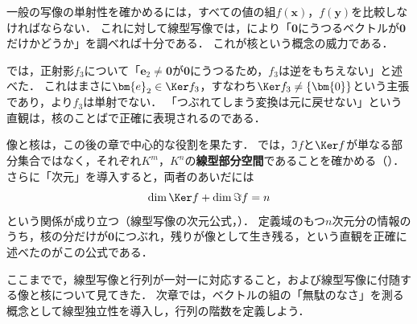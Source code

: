 一般の写像の単射性を確かめるには，すべての値の組$f(\bm{x})$，$f(\bm{y})$を比較しなければならない．
これに対して線型写像では，により「$\bm{0}$にうつるベクトルが$\bm{0}$だけかどうか」を調べれば十分である．
これが核という概念の威力である．

では，正射影$f_3$について「$\bm{e}_2 \ne \bm{0}$が$\bm{0}$にうつるため，$f_3$は逆をもちえない」と述べた．
これはまさに$\bm{e}_2 \in \Ker f_3$，すなわち$\Ker f_3 \ne \{\bm{0}\}$という主張であり，より$f_3$は単射でない．
「つぶれてしまう変換は元に戻せない」という直観は，核のことばで正確に表現されるのである．

\begin{mycolumn}
  像と核は，この後の章で中心的な役割を果たす．
  では，$\Im f$と$\Ker f$が単なる部分集合ではなく，それぞれ$K^m$，$K^n$の\textbf{線型部分空間}であることを確かめる（）．
  さらに「次元」を導入すると，両者のあいだには
  \[
    \dim \Ker f + \dim \Im f = n
  \]
  という関係が成り立つ（線型写像の次元公式，）．
  定義域のもつ$n$次元分の情報のうち，核の分だけが$\bm{0}$につぶれ，残りが像として生き残る，という直観を正確に述べたのがこの公式である．
\end{mycolumn}

ここまでで，線型写像と行列が一対一に対応すること，および線型写像に付随する像と核について見てきた．
次章では，ベクトルの組の「無駄のなさ」を測る概念として線型独立性を導入し，行列の階数を定義しよう．
